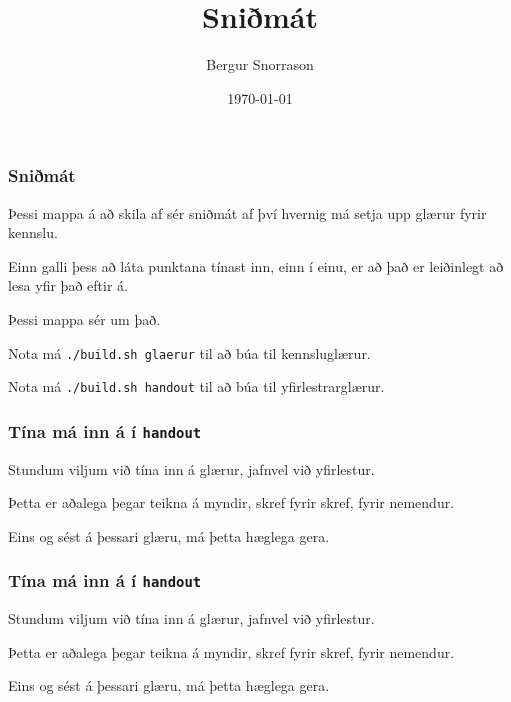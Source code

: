\title{Sniðmát}
\author{Bergur Snorrason}
\date{\today}



\frame{\titlepage}

{
    \frametitle{Sniðmát}
    {
        \item<1-> Þessi mappa á að skila af sér sniðmát af því hvernig má setja upp glærur fyrir kennslu.
        \item<2-> Einn galli þess að láta punktana tínast inn, einn í einu, er að það er leiðinlegt að lesa yfir það eftir á.
        \item<3-> Þessi mappa sér um það.
        \item<4-> Nota má \texttt{./build.sh glaerur} til að búa til kennsluglærur.
        \item<5-> Nota má \texttt{./build.sh handout} til að búa til yfirlestrarglærur.
    }
}

{
    \frametitle{Tína má inn á í \texttt{handout}}
    {
        \item<all:1-> Stundum viljum við tína inn á glærur, jafnvel við yfirlestur.
        \item<all:2-> Þetta er aðalega þegar teikna á myndir, skref fyrir skref, fyrir nemendur.
        \item<all:3-> Eins og sést á þessari glæru, má þetta hæglega gera.
    }
}

{
    \frametitle{Tína má inn á í \texttt{handout}}
    {
        \item<all:1-> Stundum viljum við tína inn á glærur, jafnvel við yfirlestur.
        \item<all:2-> Þetta er aðalega þegar teikna á myndir, skref fyrir skref, fyrir nemendur.
        \item<all:3-> Eins og sést á þessari glæru, má þetta hæglega gera.
    }
}


